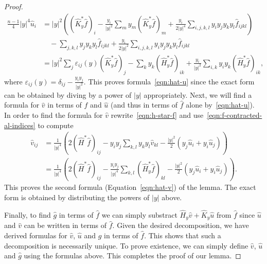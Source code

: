 \documentclass[11pt]{article}
\newcommand{\abs}[1]{\lvert #1 \rvert}
\begin{document}
\begin{proof}
\begin{equation}
\begin{split}
\frac{n-1}{4}\abs{y}^4\widehat u_i
&=
\abs{y}^2
\left(
(\widehat{K}^*_y\widehat f)_i
-
\frac{y_i}{\abs{y}^2}\sum_m y_m(\widehat{K}^*_y\widehat f)_m
+
\frac{y_i}{2\abs{y}^4}
\sum_{i,j,k,l}
y_iy_jy_ky_l\widehat f_{ijkl}
\right)
\\
&\quad
-
\sum_{j,k,l}
y_jy_ky_l\widehat f_{ijkl}
+
\frac{y_i}{2\abs{y}^2}
\sum_{i,j,k,l}
y_iy_jy_ky_l\widehat f_{ijkl}
\\
&=
\abs{y}^2
\sum_j
\varepsilon_{ij}(y)
(\widehat{K}^*_y\widehat f)_j
-
\sum_k
y_k(\widehat{H}^*_y\widehat f)_{ik}
+
\frac{y_i}{\abs{y}^2}
\sum_{i,k}
y_iy_k
(\widehat{H}^*_y\widehat f)_{ik},
\end{split}
\end{equation}
where $ \varepsilon_{ij}(y)
=
\delta_{ij}
-\frac{y_iy_j}{\abs{y}^2}.$
This proves formula~\eqref{eqn:hat-u} since the exact form can be obtained by diving by a power of $\abs{y}$ appropriately. Next, we will find a formula for $\widehat v$ in terms of $\widehat f$ and $\widehat u$ (and thus in terms of $\widehat f$ alone by~\eqref{eqn:hat-u}). In order to find the formula for $\widehat v$ rewrite~\eqref{eqn:h-star-f} and use~\eqref{eqn:f-contracted-al-indices} to compute
\begin{equation}
\begin{split}
\widehat v_{ij}
&=
\frac{1}{\abs{y}^4}
\left(
2(\widehat{H}^*\widehat f)_{ij}
-
y_iy_j
\sum_{k,l}
y_ky_l
\widehat v_{kl}
-
\frac{\abs{y}^2}{2}(y_j\widehat u_i+y_i\widehat u_j)
\right)
\\&=
\frac{1}{\abs{y}^4}
\left(
2(\widehat{H}^*\widehat f)_{ij}
-
\frac{y_iy_j}{\abs{y}^4}
\sum_{k,l}
(\widehat{H}^*_y\widehat f)_{kl}
-
\frac{\abs{y}^2}{2}(y_j\widehat u_i+y_i\widehat u_j)
\right).
\end{split}
\end{equation}
This proves the second formula (Equation~\eqref{eqn:hat-v}) of the lemma. The exact form is obtained by distributing the powers of $\abs{y}$ above.

Finally, to find $\widehat g$ in terms of $\widehat f$ we can simply substract $\widehat{H}_y\widehat v + \widehat{K}_y\widehat u$ from $\widehat f$ since $\widehat u$ and $\widehat v$ can be written in terms of $\widehat f$. Given the desired decomposition, we have derived formulas for $\widehat v$, $\widehat u$ and $\widehat g$ in terms of $\widehat f$. This shows that such a decomposition is necessarily unique. To prove existence, we can simply define $\widehat v$, $\widehat u$ and $\widehat g$ using the formulas above. This completes the proof of our lemma.
\end{proof}
\end{document}
